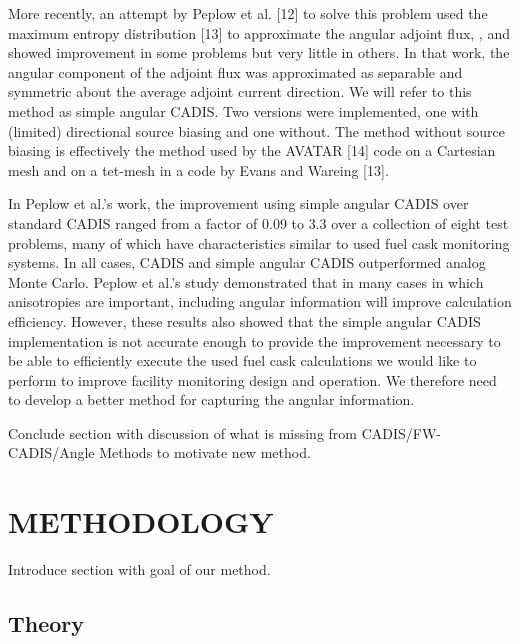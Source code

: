 \documentclass[12pt]{article}
\begin{document}
More recently, an attempt by Peplow et al. [12] to solve this problem used the maximum entropy distribution [13] to approximate the angular adjoint flux, , and showed improvement in some problems but very little in others. In that work, the angular component of the adjoint flux was approximated as separable and symmetric about the average adjoint current direction. We will refer to this method as simple angular CADIS. Two versions were implemented, one with (limited) directional source biasing and one without. The method without source biasing is effectively the method used by the AVATAR [14] code on a Cartesian mesh and on a tet-mesh in a code by Evans and Wareing [13]. 

In Peplow et al.’s work, the improvement using simple angular CADIS over standard CADIS ranged from a factor of 0.09 to 3.3 over a collection of eight test problems, many of which have characteristics similar to used fuel cask monitoring systems. In all cases, CADIS and simple angular CADIS outperformed analog Monte Carlo. Peplow et al.’s study demonstrated that in many cases in which anisotropies are important, including angular information will improve calculation efficiency. However, these results also showed that the simple angular CADIS implementation is not accurate enough to provide the improvement necessary to be able to efficiently execute the used fuel cask calculations we would like to perform to improve facility monitoring design and operation. We therefore need to develop a better method for capturing the angular information.  
	


Conclude section with discussion of what is missing from CADIS/FW-CADIS/Angle Methods to motivate new method. \\

%
\section{METHODOLOGY}
\label{sect::methodology}

Introduce section with goal of our method. \\

%
\subsection{Theory}
\label{subsect::theory}
\end{document}
